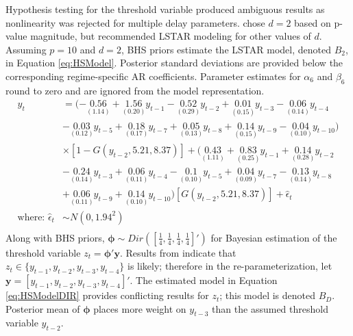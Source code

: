 Hypothesis testing for the threshold variable produced ambiguous results as nonlinearity was rejected for multiple delay parameters. \cite{Terasvirta2010} chose $d=2$ based on p-value magnitude, but recommended LSTAR modeling for other values of $d$. Assuming $p=10$ and $d=2$, BHS priors estimate the LSTAR model, denoted $B_2$, in Equation \ref{eq:HSModel}. Posterior standard deviations are provided below the corresponding regime-specific AR coefficients. Parameter estimates for $\alpha_6$ and $\beta_6$ round to zero and are ignored from the model representation.
\begin{equation}
\begin{split}
 	y_t &=(-\underset{(1.14)}{0.56}+\underset{(0.20)}{1.56}y_{t-1}-\underset{(0.29)}{0.52}y_{t-2}+\underset{(0.15)}{0.01}y_{t-3}-\underset{(0.14)}{0.06}y_{t-4}\\
 	&-\underset{(0.12)}{0.03}y_{t-5} +\underset{(0.17)}{0.18}y_{t-7}+\underset{(0.13)}{0.05}y_{t-8}+\underset{(0.15)}{0.14}y_{t-9}-\underset{(0.10)}{0.04}y_{t-10})\\
 	&\times[1-G(y_{t-2},5.21,8.37)]+(\underset{(1.11)}{0.43}+\underset{(0.25)}{0.83}y_{t-1}+\underset{(0.28)}{0.14}y_{t-2}\\
 	&-\underset{(0.14)}{0.24}y_{t-3}+\underset{(0.11)}{0.06}y_{t-4}-\underset{(0.10)}{0.1}y_{t-5}
+\underset{(0.09)}{0.04}y_{t-7}-\underset{(0.14)}{0.13}y_{t-8}\\
&+\underset{(0.11)}{0.06}y_{t-9}+\underset{(0.10)}{0.14}y_{t-10})[G(y_{t-2},5.21,8.37)]+\hat{\epsilon}_t\\
 	\textrm{where: }  \hat{\epsilon}_t &\sim N(0, 1.94^2)\\
\end{split}
\label{eq:HSModel}
\end{equation}
Along with BHS priors, $\bm{\phi} \sim Dir ([\frac{1}{4},\frac{1}{4},\frac{1}{4},\frac{1}{4}]')$ for Bayesian estimation of the threshold variable $z_t=\bm{\phi}'\bm{y}$. Results from \cite{Terasvirta2010} indicate that $z_t \in \{y_{t-1},y_{t-2},y_{t-3},y_{t-4}\}$ is likely; therefore in the re-parameterization, let $\bm{y}=[y_{t-1},y_{t-2},y_{t-3},y_{t-4}]'$. The estimated model in Equation \ref{eq:HSModelDIR} provides conflicting results for $z_t$; this model is denoted $B_D$. Posterior mean of $\bm{\phi}$ places more weight on $y_{t-3}$ than the assumed threshold variable $y_{t-2}$.
